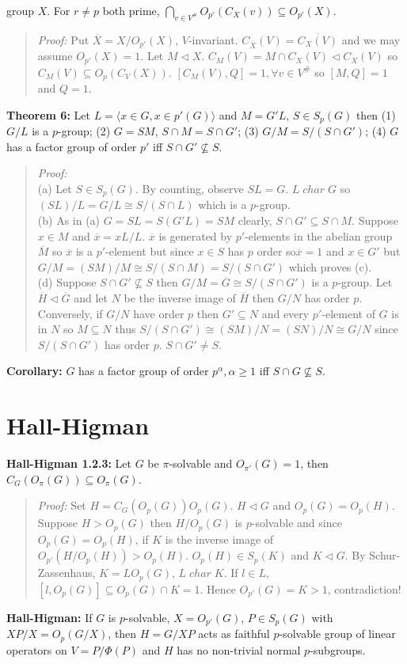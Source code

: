 group $X$.  For $r \ne p$ both prime, 
$\bigcap_{v \in V^{\#}} O_{p'}(C_X(v)) \subseteq O_{p'}(X)$.
\begin{quote}
\emph{Proof:}
Put ${\overline X}= X/O_{p'}(X)$, $V$-invariant.
$C_{\overline X}(V)= {\overline {C_X(V)}}$ and we may assume $O_{p'}(X)=1$.
Let $M \lhd X$.
$C_M(V)= M \cap C_X(V) \lhd C_X(V)$ so  $C_M(V) \subseteq O_p(C_V(X))$.
$[C_M(V), Q]= 1, \forall v \in V^{\#}$ so $[M, Q] =1$ and $Q=1$.
\end{quote}
{\bf Theorem 6:}
Let $L= \langle x \in G, x \in p'(G) \rangle $ and $M=G'L$, $S \in S_p(G)$ then
(1) $G/L$ is a $p$-group; (2) $G=SM$, $S \cap M = S \cap G'$;
(3) $G/M= S/(S \cap G')$; (4) $G$ has a factor group of order
$p'$ iff $S \cap G' \nsubseteq S$.
\begin{quote}
\emph{Proof:}
\\
(a) Let $S \in S_p(G)$.  By counting, observe $SL=G$.  $L \; char \; G$ so
$(SL)/L= G/L \cong S/(S \cap L)$ which is a $p$-group.
\\
(b) As in (a) $G= SL = S(G'L) = SM$ clearly, $S \cap G' \subseteq S \cap M$.
Suppose $x \in M$ and ${\overline x} = xL/L$.  ${\overline x}$ is generated
by $p'$-elements in the abelian group ${\overline M}$ so ${\overline x}$ is
a $p'$-element but since $x \in S$ has $p$ order so${\overline x} =1$ and
$x \in G'$ but $G/M = (SM)/M \cong S/(S \cap M) = S/(S \cap G')$ which proves (c).
\\
(d) 
Suppose $S \cap G' \nsubseteq S$ then $G/M= {\overline G} \cong S/(S \cap G')$ is a 
$p$-group.  Let ${\overline H} \lhd {\overline G}$ and let $N$ be the inverse image
of ${\overline H}$ then $G/N$ has order $p$.  Conversely,
if $G/N$ have order $p$ then $G' \subseteq N$ and every $p'$-element of $G$ is in
$N$ so $M \subseteq N$ thus $S/(S \cap G') \cong (SM)/N = (SN)/N \cong G/N$
since $S/(S \cap G')$ has order $p$.
$S \cap G' \ne S$.
\end{quote}
{\bf Corollary:} $G$ has a factor group of order $p^{\alpha}, \alpha \ge 1$ iff
$S \cap G \nsubseteq S$.
\section {Hall-Higman}
{\bf Hall-Higman 1.2.3:}  
Let $G$ be $\pi$-solvable and $O_{\pi'}(G)=1$, then
$C_G(O_{\pi}(G)) \subseteq O_{\pi}(G)$.
\begin{quote}
\emph{Proof:}  
Set $H= C_G(O_p(G)) O_p(G)$.  $H \lhd G$ 
and $O_p(G)=O_p(H)$.
Suppose $H > O_p(G)$ then $H/O_p(G)$ is $p$-solvable 
and since $O_p(G)=O_p(H)$, if $K$ is the inverse image of $O_{p'}(H/O_p(H)) > O_p(H)$.
$O_p(H) \in S_p(K)$ and $K \lhd G$.
By Schur-Zassenhaus, $K=L O_p(G)$, $L \; char \; K$.  
If $l \in L$, $[l, O_p(G)] \subseteq O_p(G) \cap K =1$.  Hence $O_{p'}(G)= K >1$, contradiction!
\end{quote}
{\bf Hall-Higman:} If $G$ is $p$-solvable, $X= O_{p'}(G)$, $P \in S_p(G)$ with
$XP/X= O_p(G/X)$, then $H=G/XP$ acts as faithful $p$-solvable group of linear
operators on $V= P/\Phi(P)$ and $H$ has no non-trivial normal $p$-subgroups.
